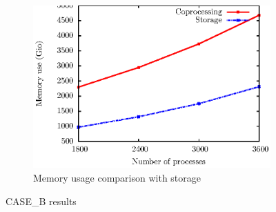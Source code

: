 \begin{figure}
        \begin{subfigure}[b]{0.40\linewidth}
                \includegraphics[scale=0.60]{pictures/test32.ps}
                \caption{Memory usage comparison with storage}
                \label{fig:204mem}
        \end{subfigure}
        \caption{CASE\_B results}\label{fig:animals}
\end{figure}

